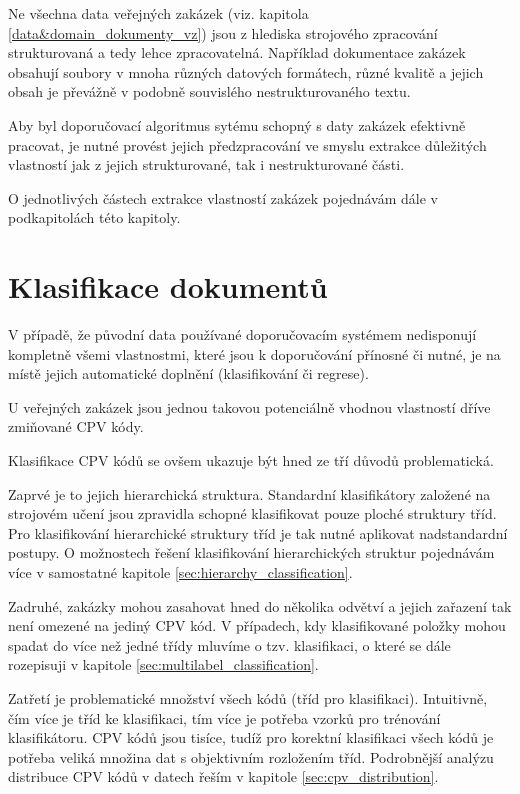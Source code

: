 \documentclass[thesis=M,czech]{FITthesis}[2019/12/23]
\begin{document}
Ne všechna data veřejných zakázek (viz. kapitola \ref{data&domain_dokumenty_vz}) jsou z hlediska strojového zpracování strukturovaná a tedy lehce zpracovatelná. Například dokumentace zakázek obsahují soubory v mnoha různých datových formátech, různé kvalitě a jejich obsah je převážně v podobně souvislého nestrukturovaného textu.

Aby byl doporučovací algoritmus sytému schopný s daty zakázek efektivně pracovat, je nutné provést jejich předzpracování ve smyslu extrakce důležitých vlastností jak z jejich strukturované, tak i nestrukturované části.

O jednotlivých částech extrakce vlastností zakázek pojednávám dále v podkapitolách této kapitoly.

\newpage
\section{Klasifikace dokumentů}

V případě, že původní data používané doporučovacím systémem nedisponují kompletně všemi vlastnostmi, které jsou k doporučování přínosné či nutné, je na místě jejich automatické doplnění (klasifikování či regrese).

U veřejných zakázek jsou jednou takovou potenciálně vhodnou vlastností dříve zmiňované CPV kódy. 

Klasifikace CPV kódů se ovšem ukazuje být hned ze tří důvodů problematická.

Zaprvé je to jejich hierarchická struktura. Standardní klasifikátory založené na strojovém učení jsou zpravidla schopné klasifikovat pouze ploché struktury tříd. Pro klasifikování hierarchické struktury tříd je tak nutné aplikovat nadstandardní postupy. O možnostech řešení klasifikování hierarchických struktur pojednávám více v samostatné kapitole \ref{sec:hierarchy_classification}.

Zadruhé, zakázky mohou zasahovat hned do několika odvětví a jejich zařazení tak není omezené na jediný CPV kód. V případech, kdy klasifikované položky mohou spadat do více než jedné třídy mluvíme o tzv.  klasifikaci, o které se dále rozepisuji v kapitole \ref{sec:multilabel_classification}.

Zatřetí je problematické množství všech kódů (tříd pro klasifikaci). Intuitivně, čím více je tříd ke klasifikaci, tím více je potřeba vzorků pro trénování klasifikátoru. CPV kódů jsou tisíce, tudíž pro korektní klasifikaci všech kódů je potřeba veliká množina dat s objektivním rozložením tříd. Podrobnější analýzu distribuce CPV kódů v datech řeším v kapitole \ref{sec:cpv_distribution}.
\end{document}
